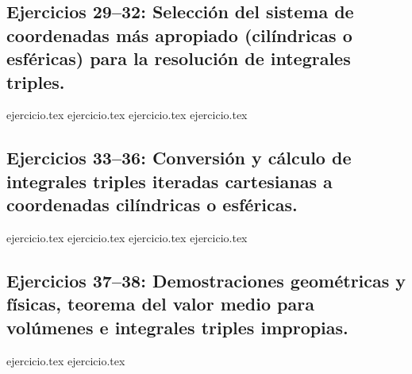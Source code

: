 \subsection*{Ejercicios 29--32: Selección del sistema de coordenadas más apropiado (cilíndricas o esféricas) para la resolución de integrales triples.}
\begin{enumerate}
    \setcounter{enumi}{28}
    {ejercicio.tex}
    {ejercicio.tex}
    {ejercicio.tex}
    {ejercicio.tex}
\end{enumerate}

\subsection*{Ejercicios 33--36: Conversión y cálculo de integrales triples iteradas cartesianas a coordenadas cilíndricas o esféricas.}
\begin{enumerate}
    \setcounter{enumi}{32}
    {ejercicio.tex}
    {ejercicio.tex}
    {ejercicio.tex}
    {ejercicio.tex}
\end{enumerate}

\subsection*{Ejercicios 37--38: Demostraciones geométricas y físicas, teorema del valor medio para volúmenes e integrales triples impropias.}
\begin{enumerate}
    \setcounter{enumi}{36}
    {ejercicio.tex}
    {ejercicio.tex}
\end{enumerate}
